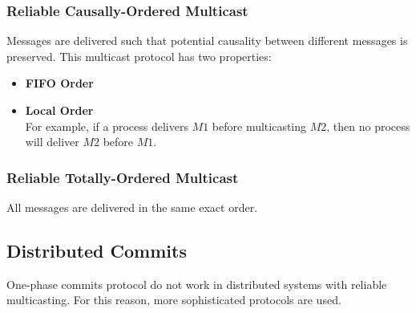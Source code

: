 \documentclass{article}
\begin{document}
\subsubsection{Reliable Causally-Ordered Multicast}
Messages are delivered such that potential causality between different messages is preserved. This multicast protocol has two properties:
\begin{itemize}
	\item \textbf{FIFO Order}
	\item \textbf{Local Order} \\
	For example, if a process delivers $M1$ before multicasting $M2$, then no process will deliver $M2$ before $M1$.
\end{itemize}

\subsubsection{Reliable Totally-Ordered Multicast}
All messages are delivered in the same exact order.

\subsection{Distributed Commits}
One-phase commits protocol do not work in distributed systems with reliable multicasting. For this reason, more sophisticated protocols are used.
\end{document}

